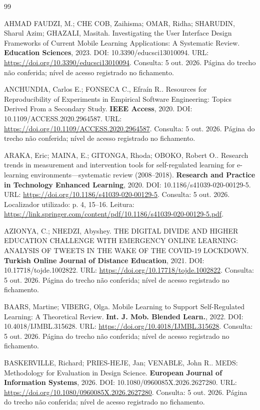 \begin{thebibliography}{99}

 AHMAD FAUDZI, M.; CHE COB, Zaihisma; OMAR, Ridha; SHARUDIN, Sharul Azim; GHAZALI, Masitah. Investigating the User Interface Design Frameworks of Current Mobile Learning Applications: A Systematic Review. \textbf{Education Sciences}, 2023. DOI: 10.3390/educsci13010094. URL: \url{https://doi.org/10.3390/educsci13010094}. Consulta: 5 out. 2026. Página do trecho não conferida; nível de acesso registrado no fichamento.

 ANCHUNDIA, Carlos E.; FONSECA C., Efraín R.. Resources for Reproducibility of Experiments in Empirical Software Engineering: Topics Derived From a Secondary Study. \textbf{IEEE Access}, 2020. DOI: 10.1109/ACCESS.2020.2964587. URL: \url{https://doi.org/10.1109/ACCESS.2020.2964587}. Consulta: 5 out. 2026. Página do trecho não conferida; nível de acesso registrado no fichamento.

 ARAKA, Eric; MAINA, E.; GITONGA, Rhoda; OBOKO, Robert O.. Research trends in measurement and intervention tools for self-regulated learning for e-learning environments—systematic review (2008–2018). \textbf{Research and Practice in Technology Enhanced Learning}, 2020. DOI: 10.1186/s41039-020-00129-5. URL: \url{https://doi.org/10.1186/s41039-020-00129-5}. Consulta: 5 out. 2026. Localizador utilizado: p. 4, 15–16. Leitura: \url{https://link.springer.com/content/pdf/10.1186/s41039-020-00129-5.pdf}.

 AZIONYA, C.; NHEDZI, Abyshey. THE DIGITAL DIVIDE AND HIGHER EDUCATION CHALLENGE WITH EMERGENCY ONLINE LEARNING: ANALYSIS OF TWEETS IN THE WAKE OF THE COVID-19 LOCKDOWN. \textbf{Turkish Online Journal of Distance Education}, 2021. DOI: 10.17718/tojde.1002822. URL: \url{https://doi.org/10.17718/tojde.1002822}. Consulta: 5 out. 2026. Página do trecho não conferida; nível de acesso registrado no fichamento.

 BAARS, Martine; VIBERG, Olga. Mobile Learning to Support Self-Regulated Learning: A Theoretical Review. \textbf{Int. J. Mob. Blended Learn.}, 2022. DOI: 10.4018/IJMBL.315628. URL: \url{https://doi.org/10.4018/IJMBL.315628}. Consulta: 5 out. 2026. Página do trecho não conferida; nível de acesso registrado no fichamento.

 BASKERVILLE, Richard; PRIES-HEJE, Jan; VENABLE, John R.. MEDS: Methodology for Evaluation in Design Science. \textbf{European Journal of Information Systems}, 2026. DOI: 10.1080/0960085X.2026.2627280. URL: \url{https://doi.org/10.1080/0960085X.2026.2627280}. Consulta: 5 out. 2026. Página do trecho não conferida; nível de acesso registrado no fichamento.


\end{thebibliography}
